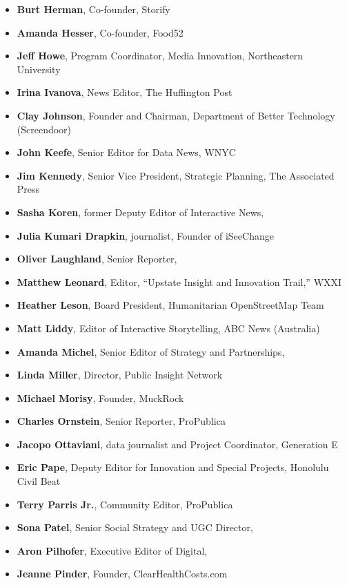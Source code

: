\begin{itemize}
\begin{itemize}
\item \textbf{Burt Herman}, Co-founder, Storify
\item \textbf{Amanda Hesser}, Co-founder, Food52
\item \textbf{Jeff Howe}, Program Coordinator, Media Innovation, Northeastern University
\item \textbf{Irina Ivanova}, News Editor, The Huffington Post
\item \textbf{Clay Johnson}, Founder and Chairman, Department of Better Technology (Screendoor)
\item \textbf{John Keefe}, Senior Editor for Data News, WNYC
\item \textbf{Jim Kennedy}, Senior Vice President, Strategic Planning, The Associated Press
\item \textbf{Sasha Koren}, former Deputy Editor of Interactive News, 
\item \textbf{Julia Kumari Drapkin}, journalist, Founder of iSeeChange
\item \textbf{Oliver Laughland}, Senior Reporter, 
\item \textbf{Matthew Leonard}, Editor, ``Upstate Insight and Innovation Trail,'' WXXI
\item \textbf{Heather Leson}, Board President, Humanitarian OpenStreetMap Team
\item \textbf{Matt Liddy}, Editor of Interactive Storytelling, ABC News (Australia)
\item \textbf{Amanda Michel}, Senior Editor of Strategy and Partnerships, 
\item \textbf{Linda Miller}, Director, Public Insight Network
\item \textbf{Michael Morisy}, Founder, MuckRock
\item \textbf{Charles Ornstein}, Senior Reporter, ProPublica
\item \textbf{Jacopo Ottaviani}, data journalist and Project Coordinator, Generation E
\item \textbf{Eric Pape}, Deputy Editor for Innovation and Special Projects, Honolulu Civil Beat
\item \textbf{Terry Parris Jr.}, Community Editor, ProPublica
\item \textbf{Sona Patel}, Senior Social Strategy and UGC Director, 
\item \textbf{Aron Pilhofer}, Executive Editor of Digital, 
\item \textbf{Jeanne Pinder}, Founder, ClearHealthCosts.com

\end{itemize}
\end{itemize}
